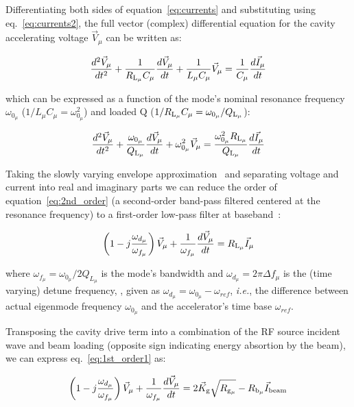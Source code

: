 \documentclass[a4paper,12pt]{article}
\begin{document}
Differentiating both sides of equation~\ref{eq:currents} and substituting using eq.~\ref{eq:currents2}, the full vector (complex) differential equation for the cavity accelerating voltage $\vec V_{\mu}$ can be written as:

\begin{equation}
  \frac{d^2\vec V_{\mu}}{dt^2} + \frac{1}{R_{\rm L_{\mu}}C_{\mu}}\frac{d\vec V_{\mu}}{dt} + \frac{1}{L_{\mu}C_{\mu}}\vec V_{\mu} = \frac{1}{C_{\mu}}\frac{d\vec I_{\mu}}{dt}
\end{equation}

\noindent which can be expressed as a function of the mode's nominal resonance frequency $\omega_{0_{\mu}}$ ($1/L_{\mu}C_{\mu}=\omega_{0_{\mu}}^2$) and loaded Q ($1/R_{\rm L_{\mu}}C_{\mu}=\omega_{0_{\mu}}/Q_{\rm L_{\mu}}$):
 
\begin{equation}
  \frac{d^2\vec V_{\mu}}{dt^2} + \frac{\omega_{0_{\mu}}}{Q_{\rm L_{\mu}}}\frac{d\vec V_{\mu}}{dt} + \omega_{0_{\mu}}^2 \vec V_{\mu} = \frac{\omega_{0_{\mu}}^2 R_{\rm L_{\mu}}}{Q_{\rm L_{\mu}}}\frac{d\vec I_{\mu}}{dt}
  \label{eq:2nd_order}
\end{equation}

Taking the slowly varying envelope approximation~\cite{ref:svea} and separating voltage and current into real and imaginary parts we can reduce the order of equation~\ref{eq:2nd_order} (a second-order band-pass filtered centered at the resonance frequency) to a first-order low-pass filter at baseband~\cite{ref:schilcher}:

\begin{equation}
  \left(1-j\frac{\omega_{d_{\mu}}}{\omega_{f_{\mu}}}\right)\vec V_{\mu} + \frac{1}{\omega_{f_{\mu}}}\frac{d\vec V_{\mu}}{dt} = R_{\rm L_{\mu}} \vec I_{\mu}
  \label{eq:1st_order1}
\end{equation}

\noindent where $\omega_{f_{\mu}}=\omega_{0_{\mu}}/2Q_{L_{\mu}}$ is the mode's bandwidth and $\omega_{d_{\mu}}=2\pi\Delta f_{\mu}$ is the (time varying) detune frequency,  , given as $\omega_{d_{\mu}}=\omega_{0_{\mu}}-\omega_{ref}$, {\it i.e.}, the difference between actual eigenmode frequency $\omega_{0_{\mu}}$ and the accelerator's time base $\omega_{ref}$.

Transposing the cavity drive term into a combination of the RF source incident wave and beam loading (opposite sign indicating energy absortion by the beam), we can express eq.~\ref{eq:1st_order1} as:

\begin{equation}
  \left(1-j\frac{\omega_{d_{\mu}}}{\omega_{f_{\mu}}}\right)\vec V_{\mu} + {\frac{1}{\omega_{f_{\mu}}}}\frac{d\vec V_{\mu}}{dt} =  2\vec K_{\rm g}\sqrt{R_{\rm g_{\mu}}} - R_{\rm b_{\mu}}\vec I_{\rm beam}
  \label{eq:1st_order2}
\end{equation}
\end{document}
